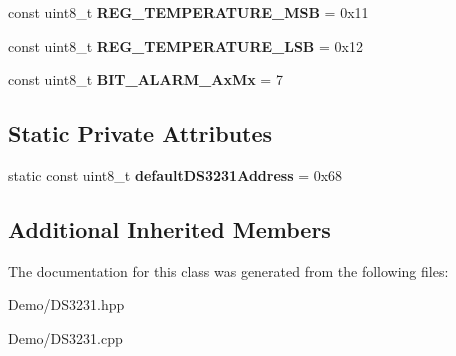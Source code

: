 \begin{DoxyCompactItemize}
\item 
\mbox{\label{class_d_s3231_a0334c3d383e5f28df368f21062672228}} 
const uint8\+\_\+t {\bfseries R\+E\+G\+\_\+\+T\+E\+M\+P\+E\+R\+A\+T\+U\+R\+E\+\_\+\+M\+SB} = 0x11
\item 
\mbox{\label{class_d_s3231_a6bc742bfa52c83f252787045c9952a45}} 
const uint8\+\_\+t {\bfseries R\+E\+G\+\_\+\+T\+E\+M\+P\+E\+R\+A\+T\+U\+R\+E\+\_\+\+L\+SB} = 0x12
\item 
\mbox{\label{class_d_s3231_a5f55646a365acc7123c76b2c363eb416}} 
const uint8\+\_\+t {\bfseries B\+I\+T\+\_\+\+A\+L\+A\+R\+M\+\_\+\+Ax\+Mx} = 7
\end{DoxyCompactItemize}
\subsection*{Static Private Attributes}
\begin{DoxyCompactItemize}
\item 
\mbox{\label{class_d_s3231_a9c6b5e3dea008155e78dfc6623fe41b9}} 
static const uint8\+\_\+t {\bfseries default\+D\+S3231\+Address} = 0x68
\end{DoxyCompactItemize}
\subsection*{Additional Inherited Members}


The documentation for this class was generated from the following files\+:\begin{DoxyCompactItemize}
\item 
Demo/D\+S3231.\+hpp\item 
Demo/D\+S3231.\+cpp\end{DoxyCompactItemize}
